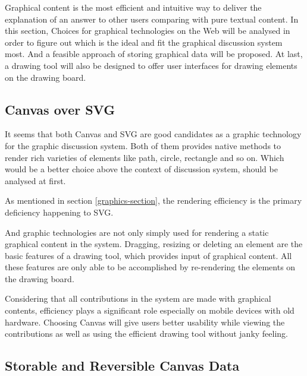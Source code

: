 
Graphical content is the most efficient and intuitive way to deliver the explanation of an answer to other users comparing with pure textual content. In this section, Choices for graphical technologies on the Web will be analysed in order to figure out which is the ideal and fit the graphical discussion system most. And a feasible approach of storing graphical data will be proposed. At last, a drawing tool will also be designed to offer user interfaces for drawing elements on the drawing board.

\subsection{Canvas over SVG}
It seems that both Canvas and SVG are good candidates as a graphic technology for the graphic discussion system. Both of them provides native methods to render rich varieties of elements like path, circle, rectangle and so on. Which would be a better choice above the context of discussion system, should be analysed at first.

As mentioned in section \ref{graphics-section}, the rendering efficiency is the primary deficiency happening to SVG. 

And graphic technologies are not only simply used for rendering a static graphical content in the system. Dragging, resizing or deleting an element are the basic features of a drawing tool, which provides input of graphical content. All these features are only able to be accomplished by re-rendering the elements on the drawing board. 

Considering that all contributions in the system are made with graphical contents, efficiency plays a significant role especially on mobile devices with old hardware. Choosing Canvas will give users better usability while viewing the contributions as well as using the efficient drawing tool without janky feeling. 


\subsection{Storable and Reversible Canvas Data }\label{subsec:storable-canvas-data}

